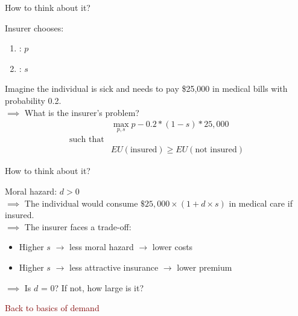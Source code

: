 \begin{frame}{How to think about it?}

Insurer chooses:
\begin{enumerate}
    \item {}: $p$
    \item {}: $s$
\end{enumerate}
\vspace{5mm}
Imagine the individual is sick and needs to pay \$25,000 in medical bills with probability 0.2.\\
$\implies$ What is the insurer's problem?\\
\pause
\begin{align*}
    &\max_{p,s} p - 0.2 * (1-s) * 25,000\\
    \text{such that}&\\
    & EU(\text{insured}) \geq EU(\text{not insured})
\end{align*}

\end{frame}
\begin{frame}{How to think about it?}

Moral hazard: $d > 0$\\
$\implies$ The individual would consume $\$25,000 \times \left( 1 + d \times s \right)$ in medical care if insured.\\
\vspace{5mm}
$\implies$ The insurer faces a trade-off:
\begin{itemize}
    \item Higher $s$ $\rightarrow$ less moral hazard $\rightarrow$ lower costs
    \item Higher $s$ $\rightarrow$ less attractive insurance $\rightarrow$ lower premium
\end{itemize}
\pause 
\vspace{5mm}
$\implies$ Is $d$ = 0? If not, how large is it?

\end{frame}
\begin{frame}{}

    \begin{center}
        \Large \textcolor{maroon}{Back to basics of demand}
        \end{center}
\end{frame}
